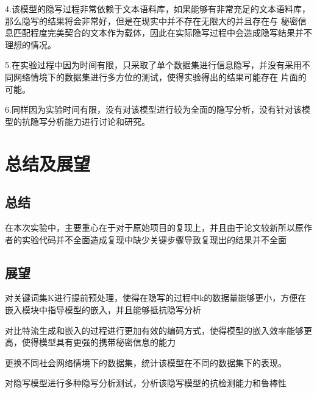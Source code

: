\documentclass[a4paper,11pt,UTF8]{ctexart}
\begin{document}
  4.该模型的隐写过程非常依赖于文本语料库，如果能够有非常充足的文本语料库，那么隐写的结果将会非常好，但是在现实中并不存在无限大的并且存在与
  秘密信息匹配程度完美契合的文本作为载体，因此在实际隐写过程中会造成隐写结果并不理想的情况。\par
  5.在实验过程中因为时间有限，只采取了单个数据集进行信息隐写，并没有采用不同网络情境下的数据集进行多方位的测试，使得实验得出的结果可能存在
  片面的可能。\par
  6.同样因为实验时间有限，没有对该模型进行较为全面的隐写分析，没有针对该模型的抗隐写分析能力进行讨论和研究。

\section{总结及展望}

  \subsection{总结}
    在本次实验中，主要重心在于对于原始项目的复现上，并且由于论文较新所以原作者的实验代码并不全面造成复现中缺少关键步骤导致复现出的结果并不全面
  \subsection{展望}
    对关键词集K进行提前预处理，使得在隐写的过程中k的数据量能够更小，方便在嵌入模块中指导模型的嵌入，并且能够抵抗隐写分析\par
    对比特流生成和嵌入的过程进行更加有效的编码方式，使得模型的嵌入效率能够更高，使得模型具有更强的携带秘密信息的能力\par
    更换不同社会网络情境下的数据集，统计该模型在不同的数据集下的表现。\par
    对隐写模型进行多种隐写分析测试，分析该隐写模型的抗检测能力和鲁棒性
\end{document}
